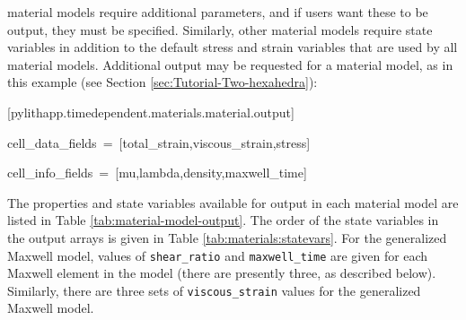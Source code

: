 material models require additional parameters, and if users want these
to be output, they must be specified. Similarly, other material models
require state variables in addition to the default stress and strain
variables that are used by all material models. Additional output
may be requested for a material model, as in this example (see Section
\vref{sec:Tutorial-Two-hexahedra}):
\begin{lyxcode}
{[}pylithapp.timedependent.materials.material.output{]}

cell\_data\_fields~=~{[}total\_strain,viscous\_strain,stress{]}

cell\_info\_fields~=~{[}mu,lambda,density,maxwell\_time{]}
\end{lyxcode}
The properties and state variables available for output in each material
model are listed in Table \vref{tab:material-model-output}. The order
of the state variables in the output arrays is given in Table \vref{tab:materials:statevars}.
For the generalized Maxwell model, values of \texttt{shear\_ratio}
and \texttt{maxwell\_time} are given for each Maxwell element in the
model (there are presently three, as described below). Similarly,
there are three sets of \texttt{viscous\_strain} values for the generalized
Maxwell model.


